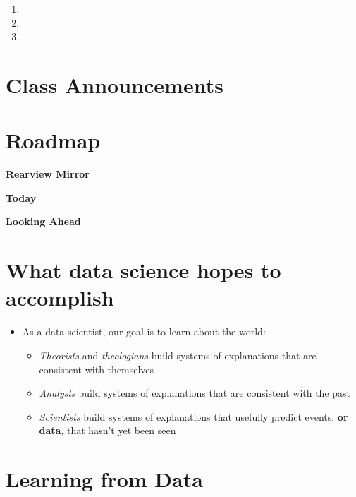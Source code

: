 \documentclass[
]{book}
\providecommand{\tightlist}{%
  \setlength{\itemsep}{0pt}\setlength{\parskip}{0pt}}
\theoremstyle{definition}
\theoremstyle{definition}
\theoremstyle{definition}
\theoremstyle{definition}
\theoremstyle{remark}
\begin{document}
\begin{enumerate}
\def\labelenumi{\arabic{enumi}.}
\tightlist
\item
\item
\item
\end{enumerate}

\hypertarget{class-announcements-11}{%
\section{Class Announcements}\label{class-announcements-11}}

\hypertarget{roadmap-10}{%
\section{Roadmap}\label{roadmap-10}}

\textbf{Rearview Mirror}

\textbf{Today}

\textbf{Looking Ahead}

\hypertarget{what-data-science-hopes-to-accomplish}{%
\section{What data science hopes to accomplish}\label{what-data-science-hopes-to-accomplish}}

\begin{itemize}
\tightlist
\item
  As a data scientist, our goal is to learn about the world:

  \begin{itemize}
  \tightlist
  \item
    \emph{Theorists} and \emph{theologians} build systems of explanations that are consistent with themselves
  \item
    \emph{Analysts} build systems of explanations that are consistent with the past
  \item
    \emph{Scientists} build systems of explanations that usefully predict events, \textbf{or data}, that hasn't yet been seen
  \end{itemize}
\end{itemize}

\hypertarget{learning-from-data}{%
\section{Learning from Data}\label{learning-from-data}}
\end{document}
